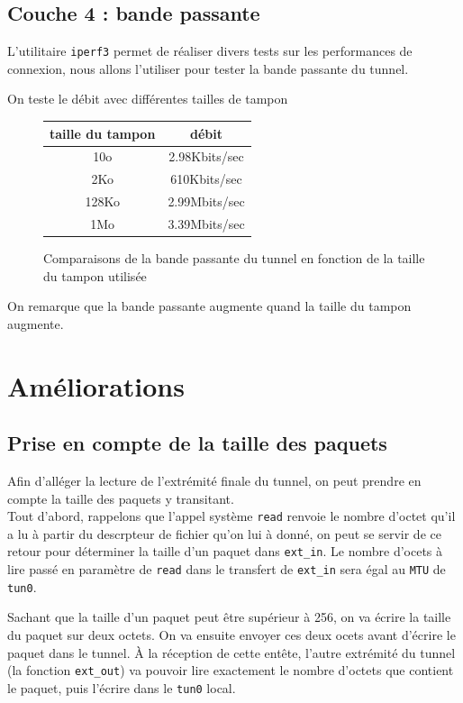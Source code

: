 \documentclass[a4paper, 10pt]{article}
\begin{document}
    \subsection{Couche 4 : bande passante}
      L'utilitaire \verb+iperf3+ permet de réaliser divers tests sur les
      performances de connexion, nous allons l'utiliser pour tester la bande
      passante du tunnel.

      On teste le débit avec différentes tailles de tampon

      \begin{figure}[h]
        \centering
        \begin{tabular}{|c|c|}
          \hline
          taille du tampon & débit \\
          \hline
          10o & 2.98Kbits/sec \\
          2Ko & 610Kbits/sec \\
          128Ko & 2.99Mbits/sec \\
          1Mo & 3.39Mbits/sec \\
          \hline
        \end{tabular}
        \caption{Comparaisons de la bande passante du tunnel en fonction de la
        taille du tampon utilisée}
      \end{figure}

      On remarque que la bande passante augmente quand la taille du tampon
      augmente.

  \section{Améliorations}
    \subsection{Prise en compte de la taille des paquets}
      Afin d'alléger la lecture de l'extrémité finale du tunnel, on peut prendre
      en compte la taille des paquets y transitant. \\

      Tout d'abord, rappelons que l'appel système \verb+read+ renvoie le nombre
      d'octet qu'il a lu à partir du descrpteur de fichier qu'on lui à donné, on
      peut se servir de ce retour pour déterminer la taille d'un paquet dans
      \verb+ext_in+. Le nombre d'ocets à lire passé en paramètre de \verb+read+
      dans le transfert de \verb+ext_in+ sera égal au \verb+MTU+ de \verb+tun0+.

      Sachant que la taille d'un paquet peut être supérieur à 256, on va écrire
      la taille du paquet sur deux octets. On va ensuite envoyer ces deux ocets
      avant d'écrire le paquet dans le tunnel. À la réception de cette entête,
      l'autre extrémité du tunnel (la fonction \verb+ext_out+) va pouvoir lire
      exactement le nombre d'octets que contient le paquet, puis l'écrire dans
      le \verb+tun0+ local. \\
\end{document}
